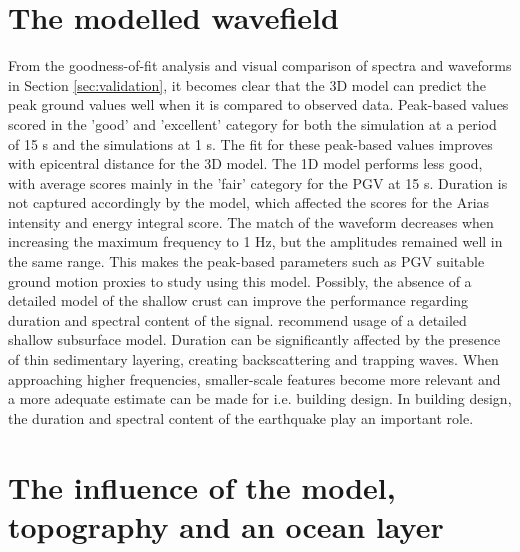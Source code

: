 \documentclass[../00main.tex]{subfiles}
\begin{document}
\section{The modelled wavefield}

From the goodness-of-fit analysis and visual comparison of spectra and waveforms in Section \ref{sec:validation}, it becomes clear that the 3D model can predict the peak ground values well when it is compared to observed data. Peak-based values scored in the 'good' and 'excellent' category for both the simulation at a period of 15 s and the simulations at 1 s. The fit for these peak-based values improves with epicentral distance for the 3D model. The 1D model performs less good, with average scores mainly in the 'fair' category for the PGV at 15 s. Duration is not captured accordingly by the model, which affected the scores for the Arias intensity and energy integral score. The match of the waveform decreases when increasing the maximum frequency to 1 Hz, but the amplitudes remained well in the same range. This makes the peak-based parameters such as PGV suitable ground motion proxies to study using this model. Possibly, the absence of a detailed model of the shallow crust can improve the performance regarding duration and spectral content of the signal. \citep{imperatori2015role} recommend usage of a detailed shallow subsurface model. Duration can be significantly affected by the presence of thin sedimentary layering, creating backscattering and trapping waves. When approaching higher frequencies, smaller-scale features become more relevant and a more adequate estimate can be made for i.e. building design. In building design, the duration and spectral content of the earthquake play an important role.


\section{The influence of the model, topography and an ocean layer}
\end{document}
